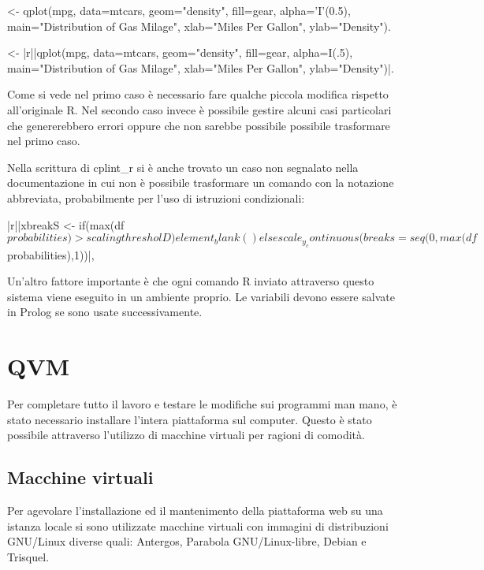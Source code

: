\documentclass[10pt,titlepage,twoside,a4paper]{report}
\newenvironment{code}{\singlespacing\captionsetup{type=listing}}{}
\begin{document}
\begin{code}
    \caption{Esempi notazioni R in SWI Prolog}
    \begin{prologcode*}{}
<- qplot(mpg, data=mtcars, geom="density", fill=gear, alpha='I'(0.5), main="Distribution of Gas Milage", xlab="Miles Per Gallon", ylab="Density").

<- {|r||qplot(mpg, data=mtcars, geom="density", fill=gear, alpha=I(.5), main="Distribution of Gas Milage", xlab="Miles Per Gallon", ylab="Density")|}.
    \end{prologcode*}
\end{code}

Come si vede nel primo caso è necessario fare qualche piccola modifica 
rispetto all'originale R. Nel secondo caso invece è possibile gestire alcuni 
casi particolari che genererebbero errori oppure che non sarebbe possibile 
possibile trasformare nel primo caso.

Nella scrittura di cplint\_r si è anche trovato un caso non segnalato nella 
documentazione in cui non è possibile trasformare un comando con la 
notazione abbreviata, probabilmente per l'uso di istruzioni condizionali:

\begin{code}
    \caption{Esempio di quasi quotation tratto da cplint\_r}
    \begin{rcode*}{}
{|r||xbreakS <- if(max(df$probabilities) > scalingthresholD) element_blank() else scale_y_continuous(breaks=seq(0,max(df$probabilities),1))|},
    \end{rcode*}
\end{code}

Un'altro fattore importante è che ogni comando R inviato attraverso questo 
sistema viene eseguito in un ambiente proprio. Le variabili devono essere 
salvate in Prolog se sono usate successivamente.


\section{QVM}
Per completare tutto il lavoro e testare le modifiche sui programmi man 
mano, è stato necessario installare l'intera piattaforma sul computer. 
Questo è stato possibile attraverso l'utilizzo di macchine virtuali 
per ragioni di comodità.

\subsection{Macchine virtuali}
Per agevolare l'installazione ed il mantenimento della piattaforma web su una 
istanza locale si sono utilizzate macchine virtuali con immagini di 
distribuzioni GNU/Linux diverse quali: Antergos, Parabola GNU/Linux-libre, 
Debian e Trisquel.
\end{document}
